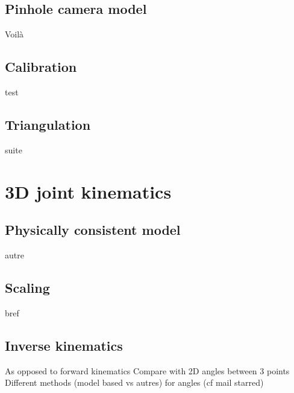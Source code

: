 \subsection{Pinhole camera model}

Voilà


\subsection{Calibration}

test


\subsection{Triangulation}

suite


\section{3D joint kinematics}

\subsection{Physically consistent model}

autre


\subsection{Scaling}

bref


\subsection{Inverse kinematics}

As opposed to forward kinematics \newline
Compare with 2D angles between 3 points \newline
Different methods (model based vs autres) for angles (cf mail starred)\newline




